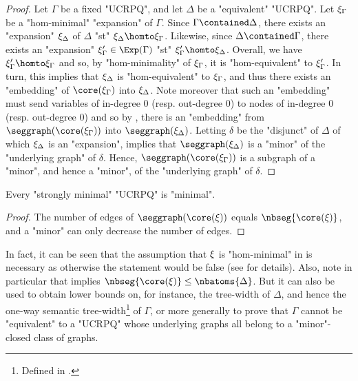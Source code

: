 \begin{proof}
	Let $\Gamma$ be a fixed "UCRPQ", and let $\Delta$ be a "equivalent" "UCRPQ".
	Let $\xi_\Gamma$ be a "hom-minimal" "expansion" of $\Gamma$.
	Since $\Gamma \contained \Delta$, there exists an "expansion" $\xi_\Delta$ of $\Delta$
	"st" $\anexpansion_\Delta \homto \anexpansion_\Gamma$. Likewise, since $\Delta \contained \Gamma$, there exists an "expansion" $\anexpansion'_\Gamma \in \Exp(\Gamma)$ "st"
	$\anexpansion'_\Gamma \homto \anexpansion_\Delta$. Overall, we have
	$\anexpansion'_\Gamma \homto \anexpansion_\Gamma$ and so,
	by "hom-minimality" of $\xi_\Gamma$, it is "hom-equivalent" to $\xi'_\Gamma$. In turn, this implies that $\xi_\Delta$ is "hom-equivalent" to $\xi_\Gamma$, 
	and thus there exists an "embedding" of
	$\core(\anexpansion_\Gamma)$ into $\xi_\Delta$.
	Note moreover that such an "embedding" must send variables of
	in-degree 0 (resp. out-degree 0) to nodes of in-degree 0 (resp. out-degree 0)
	and so by ,
	there is an "embedding" from $\seggraph(\core(\anexpansion_\Gamma))$
	into $\seggraph(\anexpansion_\Delta)$.
	Letting $\delta$ be the "disjunct" of $\Delta$ of which $\xi_\Delta$ is an "expansion",
	 implies that $\seggraph(\anexpansion_\Delta)$ is a
	"minor" of the "underlying graph" of $\delta$.
	Hence, $\seggraph(\core(\anexpansion_\Gamma))$ is a subgraph of a "minor", and hence a "minor", of the "underlying graph" of $\delta$.
\end{proof}

\begin{corollary}
	\AP\label{coro:strong-min}
	Every "strongly minimal" "UCRPQ" is "minimal".
\end{corollary}

\begin{proof}
	The number of edges of $\seggraph(\core(\anexpansion))$ equals $\nbseg{\core(\anexpansion)}$, and a "minor" can only decrease the number of edges.
\end{proof}

In fact, it can be seen that the assumption that $\xi$ is "hom-minimal" in
 is necessary as otherwise the statement would be false (see  for details).
%
Also, note in particular that  implies
$\nbseg{\core(\anexpansion)} \leq \nbatoms{\Delta}$. 
But it can also be used to obtain lower bounds on, for instance,
the tree-width of $\Delta$, and hence the one-way semantic tree-width\footnote{Defined in
\cite[\S 1, p. 7]{FM2023semantic}.} of $\Gamma$, 
or more generally to prove that $\Gamma$ cannot be "equivalent" to a "UCRPQ" whose
underlying graphs all belong to a "minor"-closed class of graphs.


